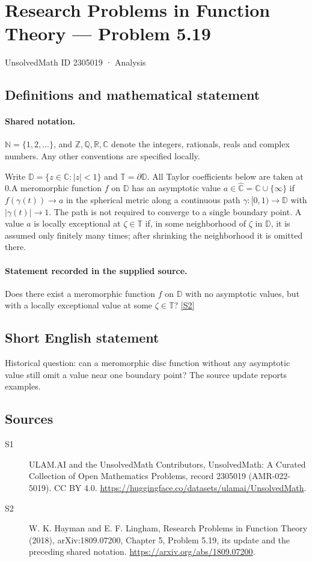 \documentclass[11pt]{article}
\newcommand{\sref}[2]{\hyperlink{source:#1:#2}{[S#2]}}
\begin{document}
\setcounter{section}{2305018}
\section{Research Problems in Function Theory — Problem 5.19}\label{2305019}
{\small\sffamily UnsolvedMath ID 2305019 · Analysis}
\subsection{Definitions and mathematical statement}

\paragraph{Shared notation.}$\mathbb N=\{1,2,\ldots\}$, and $\mathbb Z,\mathbb Q,\mathbb R,\mathbb C$ denote the integers, rationals, reals and complex numbers. Any other conventions are specified locally.


Write $\mathbb D=\{z\in\mathbb C:|z|<1\}$ and $\mathbb T=\partial\mathbb D$. All Taylor coefficients below are taken at $0$.A meromorphic function $f$ on $\mathbb D$ has an asymptotic value $a\in\widehat{\mathbb C}=\mathbb C\cup\{\infty\}$ if $f(\gamma(t))\to a$ in the spherical metric along a continuous path $\gamma:[0,1)\to\mathbb D$ with $|\gamma(t)|\to1$. The path is not required to converge to a single boundary point. A value $a$ is locally exceptional at $\zeta\in\mathbb T$ if, in some neighborhood of $\zeta$ in $\mathbb D$, it is assumed only finitely many times; after shrinking the neighborhood it is omitted there.
\paragraph{Statement recorded in the supplied source.}
Does there exist a meromorphic function $f$ on $\mathbb D$ with no asymptotic values, but with a locally exceptional value at some $\zeta\in\mathbb T$? \sref{2305019}{2}
\subsection{Short English statement}
Historical question: can a meromorphic disc function without any asymptotic value still omit a value near one boundary point? The source update reports examples.
\subsection{Sources}
\begin{description}
\item[\hypertarget{source:2305019:1}{S1}] ULAM.AI and the UnsolvedMath Contributors, UnsolvedMath: A Curated Collection of Open Mathematics Problems, record 2305019 (AMR-022-5019). CC BY 4.0. \url{https://huggingface.co/datasets/ulamai/UnsolvedMath}.
\item[\hypertarget{source:2305019:2}{S2}] W. K. Hayman and E. F. Lingham, Research Problems in Function Theory (2018), arXiv:1809.07200, Chapter 5, Problem 5.19, its update and the preceding shared notation. \url{https://arxiv.org/abs/1809.07200}.
\end{description}
\label{end:2305019}
\end{document}
